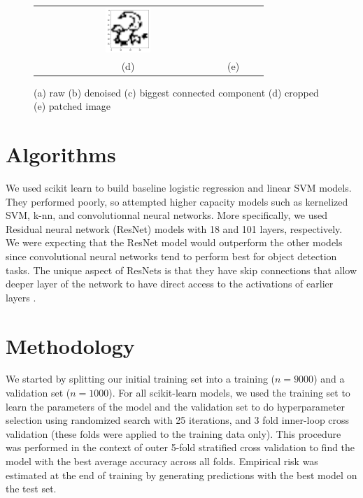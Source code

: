 \documentclass[reqno]{amsart}
\begin{document}
\begin{figure} [H]
\begin{tabular}{cccc}
\includegraphics[width=0.25\textwidth]{Figures/crop_standardize.png} \\
(d)  & (e)  \\[6pt]
\end{tabular}
\caption{(a) raw
(b) denoised
(c) biggest connected component
(d) cropped
(e) patched
image}
\label{fig:cropping}
\end{figure}

\section{Algorithms}
We used scikit learn to build baseline logistic regression and linear SVM models. They performed poorly, so attempted higher capacity models such as kernelized SVM, k-nn, and convolutionnal neural networks. More specifically, we used Residual neural network (ResNet) models with 18 and 101 layers, respectively.\\

We were expecting that the ResNet model would outperform the other models since convolutional neural networks tend to perform best for object detection tasks. The unique aspect of ResNets is that they have skip connections that allow deeper layer of the network to have direct access to the activations of earlier layers \cite{He}.

\section{Methodology}

We started by splitting our initial training set into a training ($n=9000$) and a validation set ($n=1000$). For all scikit-learn models, we used the training set to learn the parameters of the model and the validation set to do hyperparameter selection using randomized search \cite{Berg} with 25 iterations, and 3 fold inner-loop cross validation (these folds were applied to the training data only). This procedure was performed in the context of outer 5-fold stratified cross validation to find the model with the best average accuracy across all folds. Empirical risk was estimated at the end of training by generating predictions with the best model on the test set.\\    
\end{document}
